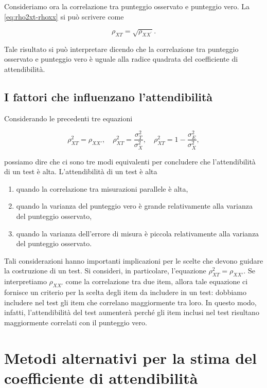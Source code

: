 \documentclass[
  11pt,
]{krantz}
\providecommand{\tightlist}{%
  \setlength{\itemsep}{0pt}\setlength{\parskip}{0pt}}
\theoremstyle{definition}
\theoremstyle{definition}
\theoremstyle{definition}
\theoremstyle{definition}
\theoremstyle{remark}
\begin{document}
Consideriamo ora la correlazione tra punteggio osservato e punteggio vero. La \eqref{eq:rho2xt-rhoxx} si può scrivere come

\[
\rho_{XT} = \sqrt{\rho_{XX^\prime}}.
\]

Tale risultato si può interpretare dicendo che la correlazione tra punteggio osservato e punteggio vero è uguale alla radice quadrata del coefficiente di attendibilità.

\hypertarget{i-fattori-che-influenzano-lattendibilituxe0}{%
\subsection{I fattori che influenzano l'attendibilità}\label{i-fattori-che-influenzano-lattendibilituxe0}}

Considerando le precedenti tre equazioni

\[
\rho^2_{XT} = \rho_{XX'},\quad
\rho_{XT}^2 = \frac{\sigma_{T}^2}{\sigma_X^2}, \quad
\rho_{XT}^2 = 1-\frac{\sigma_{E}^2}{\sigma_X^2},
\]

possiamo dire che ci sono tre modi equivalenti per concludere che l'attendibilità di un test è alta. L'attendibilità di un test è alta

\begin{enumerate}
\def\labelenumi{\arabic{enumi}.}
\tightlist
\item
  quando la correlazione tra misurazioni parallele è alta,
\item
  quando la varianza del punteggio vero è grande relativamente alla varianza del punteggio osservato,
\item
  quando la varianza dell'errore di misura è piccola relativamente alla varianza del punteggio osservato.
\end{enumerate}

Tali considerazioni hanno importanti implicazioni per le scelte che devono guidare la costruzione di un test. Si consideri, in particolare, l'equazione \(\rho^2_{XT} = \rho_{XX'}\). Se interpretiamo \(\rho_{XX'}\) come la correlazione tra due item, allora tale equazione ci fornisce un criterio per la scelta degli item da includere in un test: dobbiamo includere nel test gli item che correlano maggiormente tra loro. In questo modo, infatti, l'attendibilità del test aumenterà perché gli item inclusi nel test risultano maggiormente correlati con il punteggio vero.

\hypertarget{metodi-alternativi-per-la-stima-del-coefficiente-di-attendibilituxe0}{%
\section{Metodi alternativi per la stima del coefficiente di attendibilità}\label{metodi-alternativi-per-la-stima-del-coefficiente-di-attendibilituxe0}}
\end{document}
